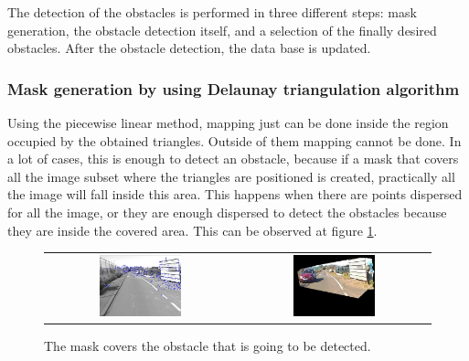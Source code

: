 The detection of the obstacles is performed in three different steps: mask generation, the obstacle detection itself, and a selection of the finally desired obstacles. After the obstacle detection, the data base is updated.

\subsubsection{Mask generation by using Delaunay triangulation algorithm}\label{ch:chapter02_01_03_01}

Using the piecewise linear method, mapping just can be done inside the region occupied by the obtained triangles. Outside of them mapping cannot be done. In a lot of cases, this is enough to detect an obstacle, because if a mask that covers all the image subset where the triangles are positioned is created, practically all the image will fall inside this area. This happens when there are points dispersed for all the image, or they are enough dispersed to detect the obstacles because they are inside the covered area. This can be observed at figure \ref{fig:cp02_mask_is_covering}.

\begin{figure}[h!]
\centering
\begin{tabular}{cc}
\includegraphics[width=0.45\textwidth]{maskCovers1}\label{fig:cp02_mask_is_covering_1} &
\includegraphics[width=0.45\textwidth]{maskCovers2}\label{fig:cp02_mask_is_covering_2}
\end{tabular}
\caption{The mask covers the obstacle that is going to be detected.}\label{fig:cp02_mask_is_covering}
\end{figure}

